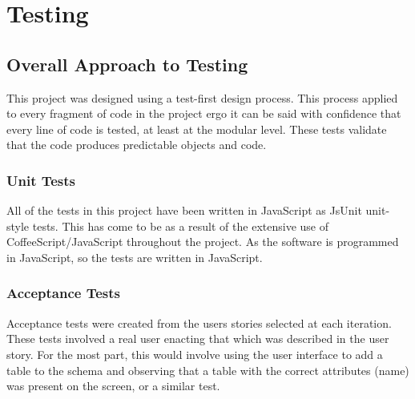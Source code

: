 \cleardoublepage
\chapter{Testing} %



\section{Overall Approach to Testing}
This project was designed using a test-first design process. This process applied to every fragment of code in the project ergo it can be said with confidence that every line of code is tested, at least at the modular level. These tests validate that the code produces predictable objects and code.

\subsection{Unit Tests}
All of the tests in this project have been written in Java\-Script as JsUnit unit-style tests. This has come to be as a result of the extensive use of Coffee\-Script\slash Java\-Script throughout the project. As the software is programmed in Java\-Script, so the tests are written in Java\-Script.

\subsection{Acceptance Tests}
Acceptance tests were created from the users stories selected at each iteration. These tests involved a real user enacting that which was described in the user story. For the most part, this would involve using the user interface to add a table to the schema and observing that a table with the correct attributes (name) was present on the screen, or a similar test.

